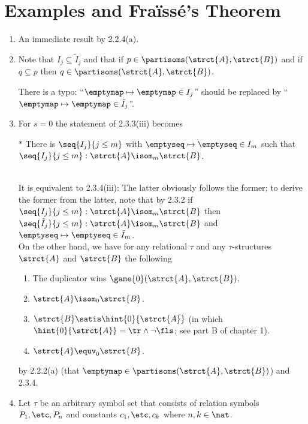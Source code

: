 \section{Examples and Fra\"{i}ss\'{e}'s Theorem}
\begin{enumerate}[1.]
%
\item {} An immediate result by 2.2.4(a).
%
\item {} Note that $I_j \subseteq \tilde{I}_j$ and that if $p \in \partisoms(\strct{A}, \strct{B})$ and if $q \subseteq p$ then $q \in \partisoms(\strct{A}, \strct{B})$.
\begin{remark}
There is a typo: ``$\emptymap \mapsto \emptymap \in I_j$'' should be replaced by ``$\emptymap \mapsto \emptymap \in \tilde{I}_j$''.
\end{remark}
%
\item {} For $s = 0$ the statement of 2.3.3(iii) becomes
\medskip\\
\begin{quoteno}{$\ast$}
There is $\seq{I_j}{j \leq m}$ with $\emptyseq \mapsto \emptyseq \in I_m$ such that $\seq{I_j}{j \leq m} : \strct{A} \isom_m \strct{B}$.
\end{quoteno}
\medskip\\
It is equivalent to 2.3.4(iii): The latter obviously follows the former; to derive the former from the latter, note that by 2.3.2 if $\seq{I_j}{j \leq m} : \strct{A} \isom_m \strct{B}$ then $\seq{\tilde{I}_j}{j \leq m} : \strct{A} \isom_m \strct{B}$ and $\emptyseq \mapsto \emptyseq \in \tilde{I}_m$.
\medskip\\
On the other hand, we have for any relational $\tau$ and any $\tau$-structures $\strct{A}$ and $\strct{B}$ the following
\begin{enumerate}[(1)]
\item The duplicator wins $\game{0}(\strct{A}, \strct{B})$.
\item $\strct{A} \isom_0 \strct{B}$.
\item $\strct{B} \satis \hint{0}{\strct{A}}$ (in which $\hint{0}{\strct{A}} = \tr \land \neg\fls$; see part B of chapter 1).
\item $\strct{A} \equv_0 \strct{B}$.
\end{enumerate}
by 2.2.2(a) (that $\emptymap \in \partisoms(\strct{A}, \strct{B})$) and 2.3.4.
%
\item {} Let $\tau$ be an arbitrary symbol set that consists of relation symbols $P_1, \etc, P_n$ and constants $c_1, \etc, c_k$ where $n, k \in \nat$.

\end{enumerate}

